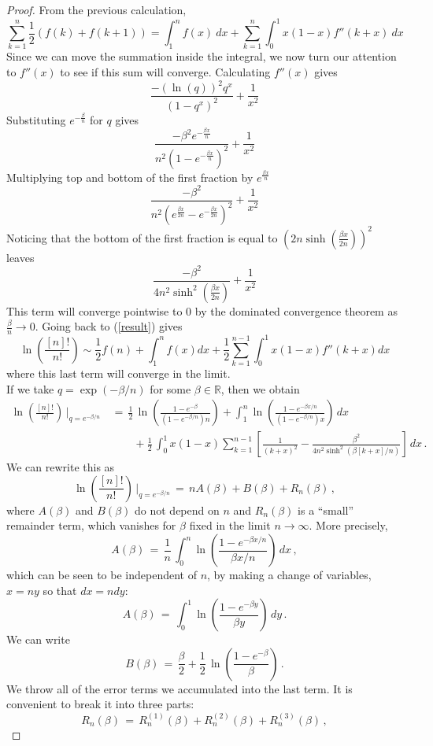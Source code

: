 \documentclass[12pt]{report}
\theoremstyle{definition}
\begin{document}
\begin{proof}
From the previous calculation, 
\[\sum_{k=1}^n\frac{1}{2}(f(k)+f(k+1))=\int_1^nf(x)\:dx+\sum_{k=1}^n\int_0^1x(1-x)f''(k+x)\:dx\]Since we can move the summation inside the integral, we now turn our attention to $f''(x)$ to see if this sum will converge.  Calculating $f''(x)$ gives \[ \frac{-(\ln(q))^2q^x}{(1-q^x)^2}+\frac{1}{x^2}\]Substituting $e^{-\frac{\beta}{n}}$ for $q$ gives \[
\frac{-\beta^2e^{-\frac{\beta x}{n}}}{n^2(1-e^{-\frac{\beta x}{n}})^2}+\frac{1}{x^2}\]Multiplying top and bottom of the first fraction by $e^{\frac{\beta x}{n}}$\[\frac{-\beta^2}{n^2(e^{\frac{\beta x}{2n}}-e^{-\frac{\beta x}{2n}})^2}+\frac{1}{x^2}\]  Noticing that the bottom of the first fraction is equal to $(2n\sinh(\frac{\beta x}{2n}))^2$ leaves \[\frac{-\beta^2}{4n^2\sinh^2(\frac{\beta x}{2n})}+\frac{1}{x^2}\]This term will converge pointwise to $0$ by the dominated convergence theorem as $\frac{\beta}{n}\rightarrow 0$.  Going back to (\ref{result}) gives \[\ln\left(\frac{[n]!}{n!}\right)\sim\frac{1}{2}f(n)+\int_1^nf(x)dx+\frac{1}{2}\sum_{k=1}^{n-1}\int_0^1 x(1-x)f''(k+x)dx\] where this last term will converge  in the limit.  
\\
If we take $q = \exp(-\beta/n)$ for some $\beta \in \mathbb{R}$,
then we obtain
\begin{align*}
\ln\left(\frac{[n]!}{n!}\right)\, \Big|_{q = e^{-\beta/n}}\,
&=\, \frac{1}{2}\, \ln\left(\frac{1-e^{-\beta}}{(1-e^{-\beta/n})n}\right)
+ \int_1^n \ln\left(\frac{1-e^{-\beta x/n}}{(1-e^{-\beta/n})x}\right)\, dx\\
&\qquad + \frac{1}{2}\,\int_0^1 x(1-x)  \sum_{k=1}^{n-1} \left[\frac{1}{(k+x)^2} - \frac{\beta^2}{4 n^2 \sinh^2(\beta[k+x]/n)}\right]\, dx\, .
\end{align*}
We can rewrite this as
$$
\ln\left(\frac{[n]!}{n!}\right)\, \Big|_{q = e^{-\beta/n}}\,
=\, n A(\beta) + B(\beta) + R_n(\beta)\, ,
$$
where $A(\beta)$ and $B(\beta)$ do not depend on $n$ and $R_n(\beta)$ is a ``small'' remainder term,
which vanishes for $\beta$ fixed in the limit $n \to \infty$.
More precisely,
$$
A(\beta)\, =\, \frac{1}{n}\, \int_0^n  \ln\left(\frac{1-e^{-\beta x/n}}{\beta x/n}\right)\, dx\, ,
$$
which can be seen to be independent of $n$, by making a change of variables, $x = n y$ so that $dx = n dy$:
$$
A(\beta)\, =\, \int_0^1 \ln\left(\frac{1-e^{-\beta y}}{\beta y}\right)\, dy\, .
$$
We can write
$$
B(\beta)\, =\, \frac{\beta}{2} + \frac{1}{2}\, \ln\left( \frac{1-e^{-\beta}}{\beta} \right)\, .
$$
We throw all of the error terms we accumulated into the last term.
It is convenient to break it into three parts:
$$
R_n(\beta)\, =\, R_n^{(1)}(\beta) + R_n^{(2)}(\beta) + R_n^{(3)}(\beta)\, ,
$$
\end{proof}
\end{document}
